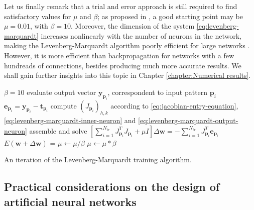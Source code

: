 \documentclass[12pt, a4paper, twoside, openright]{report}
\numberwithin{equation}{chapter}
\theoremstyle{theorem}
\theoremstyle{definition}
\theoremstyle{remark}
\theoremstyle{proposition}
\numberwithin{figure}{chapter}
\begin{document}
		Let us finally remark that a trial and error approach is still required to find satisfactory values for $\mu$ and $\beta$; as proposed in \cite{Mar63}, a good starting point may be $\mu = 0.01$, with $\beta = 10$. Moreover, the dimension of the system \eqref{eq:levenberg-marquardt} increases nonlinearly with the number of neurons in the network, making the Levenberg-Marquardt algorithm poorly efficient for large networks \cite{Hag94}. However, it is more efficient than backpropagation for networks with a few hundreads of connections, besides producing much more accurate results. We shall gain further insights into this topic in Chapter \ref{chapter:Numerical results}.
		
		\begin{algorithm}[H]
			\begin{algorithmic}[1]
					\State $\beta = 10$
						\State evaluate output vector $\mathbf{y}_{\mathbf{p}_i}$, correspondent to input pattern $\mathbf{p}_i$
						\State $\mathbf{e}_{\mathbf{p}_i} = \mathbf{y}_{\mathbf{p}_i} - \mathbf{t}_{\mathbf{p}_i}$
							\State compute $\left( J_{\mathbf{p}_i} \right)_{h,k}$ according to \eqref{eq:jacobian-entry-equation}, \eqref{eq:levenberg-marquardt-inner-neuron} and \eqref{eq:levenberg-marquardt-output-neuron} 
						\EndFor
					\EndFor
					\State assemble and solve $\left[ \sum_{i = 1}^{N_{tr}} J_{\mathbf{p}_i}^T J_{\mathbf{p}_i} + \mu I \right] \Delta \mathbf{w} = - \sum_{i = 1}^{N_{tr}} J_{\mathbf{p}_i}^T \mathbf{e}_{\mathbf{p}_i}$
					\State $E(\mathbf{w} + \Delta \mathbf{w})$ = 
						\State $\mu \leftarrow \mu / \beta$
					\Else
						\State $\mu \leftarrow \mu * \beta$
					\EndIf 
				\EndFunction
			\end{algorithmic}
			
			\caption{An iteration of the Levenberg-Marquardt training algorithm.}
			\label{alg:levenberg-marquardt}
		\end{algorithm}
						
	\subsection{Practical considerations on the design of artificial neural networks}
	\label{section:Practical considerations on the design of artificial neural networks}
	
\end{document}
